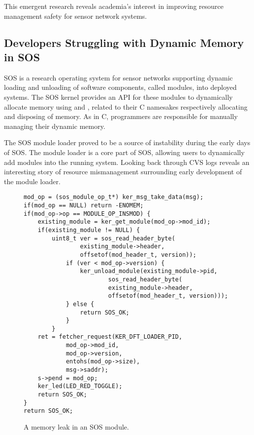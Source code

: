 This emergent research reveals academia's interest in improving resource
management safety for sensor network systems.



\subsection{Developers Struggling with Dynamic Memory in SOS}



SOS is a research operating system for sensor networks supporting dynamic
loading and unloading of software components, called modules, into deployed
systems.
%
The SOS kernel provides an API for these modules to dynamically allocate
memory using  and , related to their C
namesakes respectively allocating and disposing of memory.  
%
As in C, programmers are responsible for manually managing their dynamic
memory.  



The SOS module loader proved to be a source of instability during the early
days of SOS.
%
The module loader is a core part of SOS, allowing users to dynamically add
modules into the running system.
%
Looking back through CVS logs reveals an interesting story of resource
mismanagement surrounding early development of the module loader.



\begin{figure}[tp]
\begin{scriptsize}
\begin{verbatim}
mod_op = (sos_module_op_t*) ker_msg_take_data(msg);
if(mod_op == NULL) return -ENOMEM;
if(mod_op->op == MODULE_OP_INSMOD) {
    existing_module = ker_get_module(mod_op->mod_id);
    if(existing_module != NULL) {
        uint8_t ver = sos_read_header_byte(
                existing_module->header,
                offsetof(mod_header_t, version));
            if (ver < mod_op->version) {
                ker_unload_module(existing_module->pid, 
                        sos_read_header_byte(
                        existing_module->header,
                        offsetof(mod_header_t, version)));
            } else {
                return SOS_OK;
            }
        }
    ret = fetcher_request(KER_DFT_LOADER_PID,
            mod_op->mod_id,
            mod_op->version,
            entohs(mod_op->size),
            msg->saddr);
    s->pend = mod_op;
    ker_led(LED_RED_TOGGLE);
    return SOS_OK;
}
return SOS_OK;
\end{verbatim}
\end{scriptsize}
\caption{\label{fig:leak}A memory leak in an SOS module.}
\end{figure}



